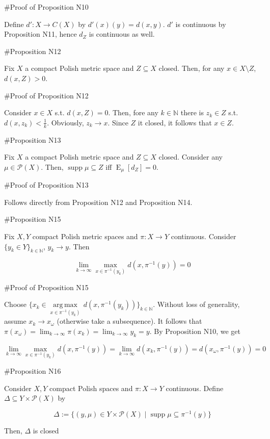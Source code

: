 \documentclass[a4paper]{article}
\DeclareMathOperator{\Supp}{supp}
\DeclareMathOperator{\E}{E}
\newcommand{\Argmax}[1]{\underset{#1}{\operatorname{arg\,max}}\,}
\newcommand{\Nats}{\mathbb{N}}
\newcommand{\Prob}{\mathcal{P}}
\begin{document}
\#Proof of Proposition N10

Define ${d': X \rightarrow C(X)}$ by ${d'(x)(y)=d(x,y)}$. ${d'}$ is continuous by Proposition N11, hence ${d_Z}$ is continuous as well.

\#Proposition N12

Fix ${X}$ a compact Polish metric space and ${Z \subseteq X}$ closed. Then, for any ${x \in X \setminus Z}$, ${d(x,Z) > 0}$.

\#Proof of Proposition N12

Consider ${x \in X}$ s.t. ${d(x,Z)=0}$. Then, fore any ${k \in \Nats}$ there is ${z_k \in Z}$ s.t. ${d(x,z_k) < \frac{1}{k}}$. Obviously, ${z_k \rightarrow x}$. Since ${Z}$ it closed, it follows that ${x \in Z}$.

\#Proposition N13

Fix ${X}$ a compact Polish metric space and ${Z \subseteq X}$ closed. Consider any ${\mu \in \Prob(X)}$. Then, ${\Supp \mu \subseteq Z}$ iff ${\E_\mu[d_Z] = 0}$.

\#Proof of Proposition N13

Follows directly from Proposition N12 and Proposition N14.

\#Proposition N15

Fix ${X,Y}$ compact Polish metric spaces and ${\pi: X \rightarrow Y}$ continuous. Consider ${\{y_k \in Y\}_{k \in \Nats}}$, ${y_k \rightarrow y}$. Then

$$\lim_{k \rightarrow \infty} \max_{x \in \pi^{-1}(y_k)} d(x,\pi^{-1}(y)) = 0$$

\#Proof of Proposition N15

Choose ${\{x_k \in \Argmax{x \in \pi^{-1}(y_k)} d(x,\pi^{-1}(y_k))\}_{k \in \Nats}}$. Without loss of generality, assume ${x_k \rightarrow x_\omega}$ (otherwise take a subsequence). It follows that ${\pi(x_\omega)=\lim_{k \rightarrow \infty}\pi(x_k) = \lim_{k \rightarrow \infty} y_k = y}$. By Proposition N10, we get

$$\lim_{k \rightarrow \infty} \max_{x \in \pi^{-1}(y_k)} d(x,\pi^{-1}(y)) = \lim_{k \rightarrow \infty} d(x_k,\pi^{-1}(y))=d(x_\omega,\pi^{-1}(y))=0$$

\#Proposition N16

Consider ${X,Y}$ compact Polish spaces and ${\pi: X \rightarrow Y}$ continuous. Define ${\Delta \subseteq Y \times \Prob(X)}$ by

$$\Delta:=\{(y,\mu) \in Y \times \Prob(X) \mid \Supp \mu \subseteq \pi^{-1}(y)\}$$

Then, ${\Delta}$ is closed
\end{document}
